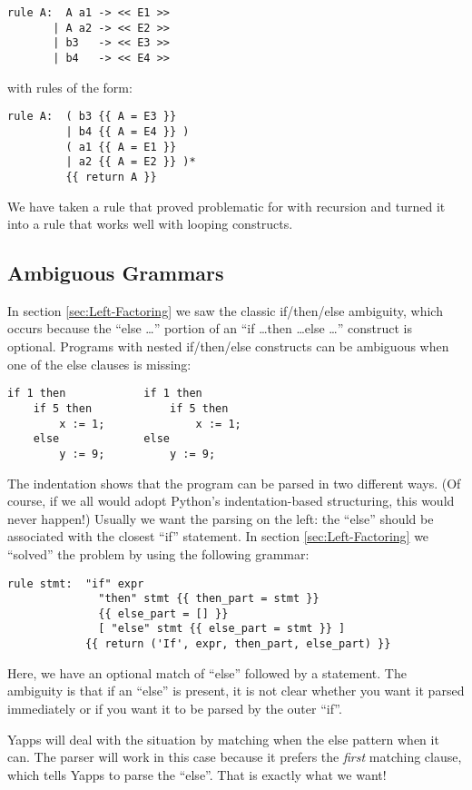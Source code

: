 \documentclass[10pt]{article}
\newcommand{\mysubsection}[1]{\subsection{\textcolor{darkerblue}{#1}}}
\begin{document}
\begin{verbatim}
rule A:  A a1 -> << E1 >> 
       | A a2 -> << E2 >>
       | b3   -> << E3 >>
       | b4   -> << E4 >>
\end{verbatim}

with rules of the form:

\begin{verbatim}
rule A:  ( b3 {{ A = E3 }} 
         | b4 {{ A = E4 }} )
         ( a1 {{ A = E1 }}
         | a2 {{ A = E2 }} )*
         {{ return A }}
\end{verbatim}

We have taken a rule that proved problematic for with recursion and
turned it into a rule that works well with looping constructs.

\mysubsection{Ambiguous Grammars}
\label{sec:Ambiguous-Grammars}

In section \ref{sec:Left-Factoring} we saw the classic if/then/else
ambiguity, which occurs because the ``else \ldots'' portion of an ``if
\ldots then \ldots else \ldots'' construct is optional.  Programs with 
nested if/then/else constructs can be ambiguous when one of the else
clauses is missing:
\begin{verbatim}
if 1 then            if 1 then
    if 5 then            if 5 then
        x := 1;              x := 1;
    else             else
        y := 9;          y := 9;
\end{verbatim}

The indentation shows that the program can be parsed in two different
ways.  (Of course, if we all would adopt Python's indentation-based
structuring, this would never happen!)  Usually we want the parsing on
the left: the ``else'' should be associated with the closest ``if''
statement.  In section \ref{sec:Left-Factoring} we ``solved'' the
problem by using the following grammar:

\begin{verbatim}
rule stmt:  "if" expr 
              "then" stmt {{ then_part = stmt }}
              {{ else_part = [] }}
              [ "else" stmt {{ else_part = stmt }} ]
            {{ return ('If', expr, then_part, else_part) }}
\end{verbatim}

Here, we have an optional match of ``else'' followed by a statement.
The ambiguity is that if an ``else'' is present, it is not clear
whether you want it parsed immediately or if you want it to be parsed
by the outer ``if''.

Yapps will deal with the situation by matching when the else pattern
when it can.  The parser will work in this case because it prefers the
\emph{first} matching clause, which tells Yapps to parse the ``else''.
That is exactly what we want!
\end{document}
